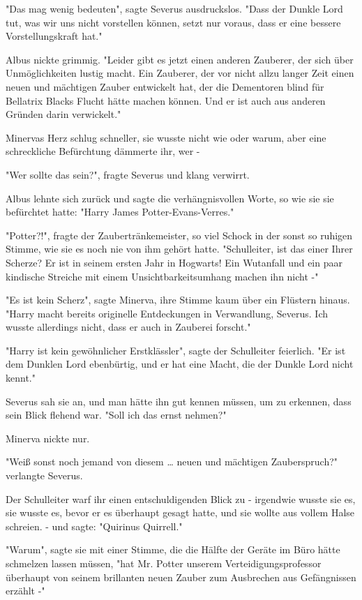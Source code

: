 {"Das mag wenig bedeuten", sagte Severus ausdruckslos. "Dass der Dunkle Lord tut, was wir uns nicht vorstellen können, setzt nur voraus, dass er eine bessere Vorstellungskraft hat."

Albus nickte grimmig. "Leider gibt es jetzt einen anderen Zauberer, der sich über Unmöglichkeiten lustig macht. Ein Zauberer, der vor nicht allzu langer Zeit einen neuen und mächtigen Zauber entwickelt hat, der die Dementoren blind für Bellatrix Blacks Flucht hätte machen können. Und er ist auch aus anderen Gründen darin verwickelt."

Minervas Herz schlug schneller, sie wusste nicht wie oder warum, aber eine schreckliche Befürchtung dämmerte ihr, wer -

"Wer sollte das sein?", fragte Severus und klang verwirrt.

Albus lehnte sich zurück und sagte die verhängnisvollen Worte, so wie sie sie befürchtet hatte: "Harry James Potter-Evans-Verres."

"Potter?!", fragte der Zaubertränkemeister, so viel Schock in der sonst so ruhigen Stimme, wie sie es noch nie von ihm gehört hatte. "Schulleiter, ist das einer Ihrer Scherze? Er ist in seinem ersten Jahr in Hogwarts! Ein Wutanfall und ein paar kindische Streiche mit einem Unsichtbarkeitsumhang machen ihn nicht -"

"Es ist kein Scherz", sagte Minerva, ihre Stimme kaum über ein Flüstern hinaus. "Harry macht bereits originelle Entdeckungen in Verwandlung, Severus. Ich wusste allerdings nicht, dass er auch in Zauberei forscht."

"Harry ist kein gewöhnlicher Erstklässler", sagte der Schulleiter feierlich. "Er ist dem Dunklen Lord ebenbürtig, und er hat eine Macht, die der Dunkle Lord nicht kennt."

Severus sah sie an, und man hätte ihn gut kennen müssen, um zu erkennen, dass sein Blick flehend war. "Soll ich das ernst nehmen?"

Minerva nickte nur.

"Weiß sonst noch jemand von diesem … neuen und mächtigen Zauberspruch?" verlangte Severus.

Der Schulleiter warf ihr einen entschuldigenden Blick zu - irgendwie wusste sie es, sie wusste es, bevor er es überhaupt gesagt hatte, und sie wollte aus vollem Halse schreien. - und sagte: "Quirinus Quirrell."

"Warum", sagte sie mit einer Stimme, die die Hälfte der Geräte im Büro hätte schmelzen lassen müssen, "hat Mr. Potter unserem Verteidigungsprofessor überhaupt von seinem brillanten neuen Zauber zum Ausbrechen aus Gefängnissen erzählt -"

}
